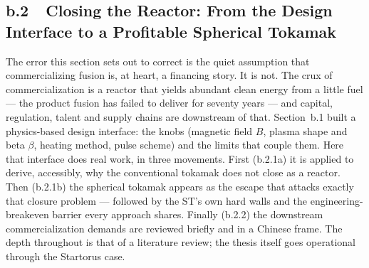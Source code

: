 \documentclass[11pt]{article}
\begin{document}

\bigskip

\subsection*{b.2~~Closing the Reactor: From the Design Interface to a Profitable Spherical Tokamak}

The error this section sets out to correct is the quiet assumption that commercializing fusion is, at heart, a financing story. It is not. The crux of commercialization is a reactor that yields abundant clean energy from a little fuel --- the product fusion has failed to deliver for seventy years --- and capital, regulation, talent and supply chains are downstream of that. Section~b.1 built a physics-based design interface: the knobs (magnetic field $B$, plasma shape and beta $\beta$, heating method, pulse scheme) and the limits that couple them. Here that interface does real work, in three movements. First (b.2.1a) it is applied to derive, accessibly, why the conventional tokamak does not close as a reactor. Then (b.2.1b) the spherical tokamak appears as the escape that attacks exactly that closure problem --- followed by the ST's own hard walls and the engineering-breakeven barrier every approach shares. Finally (b.2.2) the downstream commercialization demands are reviewed briefly and in a Chinese frame. The depth throughout is that of a literature review; the thesis itself goes operational through the Startorus case.
\end{document}
